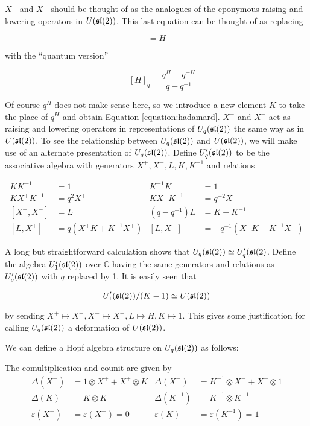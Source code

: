 $X^+$ and $X^-$ should be thought of as the analogues of the eponymous raising and
lowering operators in $U(\mathfrak{sl}(2))$. This last equation can be thought of as
replacing 

\begin{equation}
[X^+,X^-] = H
\end{equation}

with the ``quantum version''

\begin{equation}
[X^+,X^-] = [H]_q = \frac{q^H - q^{-H}}{q - q^{-1}}
\end{equation}

Of course $q^H$ does not make sense here, so we introduce a new element $K$ to
take the place of $q^H$ and obtain Equation \ref{equation:hadamard}. $X^+$ and $X^-$ act
as raising and lowering operators in representations of $U_q(\mathfrak{sl}(2))$ the same
way as in $U(\mathfrak{sl}(2))$. To see the relationship between $U_q(\mathfrak{sl}(2))$
and $U(\mathfrak{sl}(2))$, we will make use of an alternate presentation of
$U_q(\mathfrak{sl}(2))$.  Define $U'_q(\mathfrak{sl}(2))$ to be the associative algebra with
generators $ X^+ ,X^-,L,K,K^{-1}$ and relations

\begin{align}
    KK^{-1} &= 1 &  K^{-1}K  &=1 \\
    KX^+K^{-1} &= q^2 X^+ & KX^-K^{-1} &= q^{-2} X^- \\
    [X^+,X^-] &= L  & (q - q^{-1})L &= K-K^{-1} \\
    [L,X^+] &= q(X^+K + K^{-1}X^+) & [L,X^-] &= -q^{-1}(X^-K + K^{-1}X^-)
\end{align}

A long but straightforward calculation shows that $U_q(\mathfrak{sl}(2)) \simeq U_q'(\mathfrak{sl}(2)$. 
Define the algebra $U_1'(\mathfrak{sl}(2))$ over $\mathbb{C}$ having the same
generators and relations as $U_q'(\mathfrak{sl}(2))$ with $q$ replaced by 1. It is
easily seen that 

\begin{equation}
U_1'(\mathfrak{sl}(2)) /(K-1) \simeq U(\mathfrak{sl}(2))
\end{equation}

by sending $X^+ \mapsto X^+, X^- \mapsto X^-, L \mapsto H, K \mapsto 1$. This gives
some justification for calling $U_q(\mathfrak{sl}(2))$ a deformation of $U(\mathfrak{sl}(2))$.

We can define a Hopf algebra structure on $U_q(\mathfrak{sl}(2))$ as follows:

The comultiplication and counit are given by
\begin{align}
    \Delta(X^+) &= 1 \otimes  X^+  +  X^+  \otimes K &  \Delta(X^-) &= K^{-1} \otimes X^- + X^- \otimes 1 \\
    \Delta(K) &= K \otimes K &  \Delta(K^{-1}) &= K^{-1} \otimes K^{-1}\\ 
    \varepsilon(X^+) &= \varepsilon(X^-) = 0 &  \varepsilon(K) &= \varepsilon(K^{-1}) = 1
\end{align}

